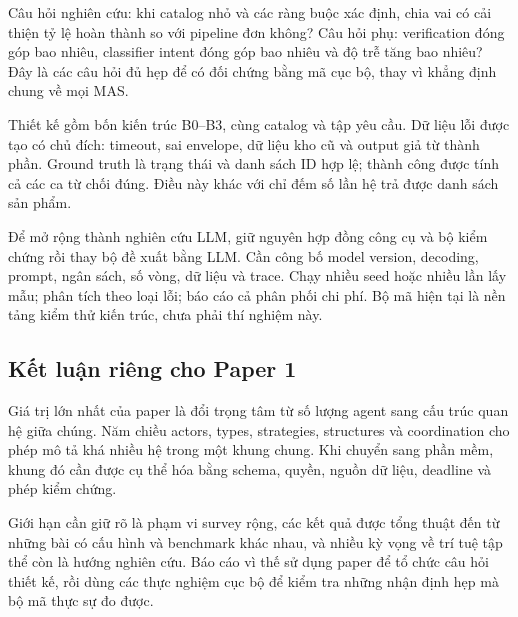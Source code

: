 Câu hỏi nghiên cứu: khi catalog nhỏ và các ràng buộc xác định, chia vai
có cải thiện tỷ lệ hoàn thành so với pipeline đơn không? Câu hỏi phụ:
verification đóng góp bao nhiêu, classifier intent đóng góp bao nhiêu và
độ trễ tăng bao nhiêu? Đây là các câu hỏi đủ hẹp để có đối chứng bằng mã
cục bộ, thay vì khẳng định chung về mọi MAS.

Thiết kế gồm bốn kiến trúc B0--B3, cùng catalog và tập yêu cầu. Dữ liệu
lỗi được tạo có chủ đích: timeout, sai envelope, dữ liệu kho cũ và
output giả từ thành phần. Ground truth là trạng thái và danh sách ID hợp
lệ; thành công được tính cả các ca từ chối đúng. Điều này khác với chỉ
đếm số lần hệ trả được danh sách sản phẩm.

Để mở rộng thành nghiên cứu LLM, giữ nguyên hợp đồng công cụ và bộ kiểm
chứng rồi thay bộ đề xuất bằng LLM. Cần công bố model version, decoding,
prompt, ngân sách, số vòng, dữ liệu và trace. Chạy nhiều seed hoặc nhiều
lần lấy mẫu; phân tích theo loại lỗi; báo cáo cả phân phối chi phí. Bộ
mã hiện tại là nền tảng kiểm thử kiến trúc, chưa phải thí nghiệm này.

\subsection{Kết luận riêng cho Paper
1}\label{kux1ebft-luux1eadn-riuxeang-cho-paper-1}

Giá trị lớn nhất của paper là đổi trọng tâm từ số lượng agent sang cấu
trúc quan hệ giữa chúng. Năm chiều actors, types, strategies, structures
và coordination cho phép mô tả khá nhiều hệ trong một khung chung. Khi
chuyển sang phần mềm, khung đó cần được cụ thể hóa bằng schema, quyền,
nguồn dữ liệu, deadline và phép kiểm chứng.

Giới hạn cần giữ rõ là phạm vi survey rộng, các kết quả được tổng thuật
đến từ những bài có cấu hình và benchmark khác nhau, và nhiều kỳ vọng về
trí tuệ tập thể còn là hướng nghiên cứu. Báo cáo vì thế sử dụng paper để
tổ chức câu hỏi thiết kế, rồi dùng các thực nghiệm cục bộ để kiểm tra
những nhận định hẹp mà bộ mã thực sự đo được.
